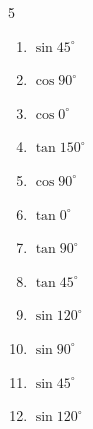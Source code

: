 \begin{multicols}{5}
\begin{enumerate}
        \phantom{$\displaystyle =0$}

  \item $\displaystyle \sin{45^\circ}$


\columnbreak %

  \item $\displaystyle \cos{90^\circ}$

        \phantom{$\displaystyle =0$}

  \item $\displaystyle \cos{0^\circ}$

        \phantom{$\displaystyle =1$}

  \item $\displaystyle \tan{150^\circ}$


  \item $\displaystyle \cos{90^\circ}$

        \phantom{$\displaystyle =0$}

  \item $\displaystyle \tan{0^\circ}$

        \phantom{$\displaystyle =0$}

  \item $\displaystyle \tan{90^\circ}$

        \phantom{$\displaystyle なし$}

  \item $\displaystyle \tan{45^\circ}$

        \phantom{$\displaystyle =1$}

  \item $\displaystyle \sin{120^\circ}$


  \item $\displaystyle \sin{90^\circ}$

        \phantom{$\displaystyle =1$}

  \item $\displaystyle \sin{45^\circ}$


  \item $\displaystyle \sin{120^\circ}$



\end{enumerate}
\end{multicols}
